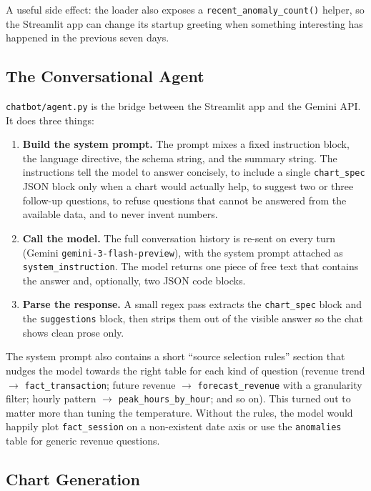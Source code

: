 \documentclass[12pt, a4paper]{report}
\begin{document}
A useful side effect: the loader also exposes a
\texttt{recent\_anomaly\_count()} helper, so the Streamlit app can change
its startup greeting when something interesting has happened in the
previous seven days.

\subsection{The Conversational Agent}

\texttt{chatbot/agent.py} is the bridge between the Streamlit app and
the Gemini API. It does three things:

\begin{enumerate}
  \item \textbf{Build the system prompt.} The prompt mixes a fixed
        instruction block, the language directive, the schema string, and
        the summary string. The instructions tell the model to answer
        concisely, to include a single \texttt{chart\_spec} JSON block
        only when a chart would actually help, to suggest two or three
        follow-up questions, to refuse questions that cannot be answered
        from the available data, and to never invent numbers.
  \item \textbf{Call the model.} The full conversation history is
        re-sent on every turn (Gemini \texttt{gemini-3-flash-preview}),
        with the system prompt attached as
        \texttt{system\_instruction}. The model returns one piece of
        free text that contains the answer and, optionally, two JSON
        code blocks.
  \item \textbf{Parse the response.} A small regex pass extracts the
        \texttt{chart\_spec} block and the \texttt{suggestions} block,
        then strips them out of the visible answer so the chat shows
        clean prose only.
\end{enumerate}

The system prompt also contains a short ``source selection rules''
section that nudges the model towards the right table for each kind of
question (revenue trend $\to$ \texttt{fact\_transaction}; future
revenue $\to$ \texttt{forecast\_revenue} with a granularity filter;
hourly pattern $\to$ \texttt{peak\_hours\_by\_hour}; and so on). This
turned out to matter more than tuning the temperature. Without the rules,
the model would happily plot \texttt{fact\_session} on a non-existent
date axis or use the \texttt{anomalies} table for generic revenue
questions.

\subsection{Chart Generation}
\end{document}
